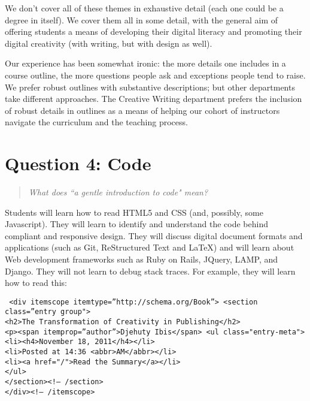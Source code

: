 \documentclass[letterpaper,10pt,headsepline]{scrreprt}
\begin{document}
We don't cover all of these themes in exhaustive detail (each one could be a degree in itself). We cover them all in some detail, with the general aim of offering students a means of developing their digital literacy and promoting their digital creativity (with writing, but with design as well).

Our experience has been somewhat ironic: the more details one includes in a course outline, the more questions people ask and exceptions people tend to raise. We prefer robust outlines with substantive descriptions; but other departments take different approaches. The Creative Writing department prefers the inclusion of robust details in outlines as a means of helping our cohort of instructors navigate the curriculum and the teaching process.

\section{Question 4: Code}

\begin{quote}
\textit{What does ``a gentle introduction to code" mean?}
\end{quote}

Students will learn how to read HTML5 and CSS (and, possibly, some Javascript). They will learn to identify and understand the code behind compliant and responsive design. They will discuss digital document formats and applications (such as Git, ReStructured Text and \LaTeX) and will learn about Web development frameworks such as Ruby on Rails, JQuery, LAMP, and Django. They will not learn to debug stack traces. For example, they will learn how to read this:

\vspace{10 pt}
\texttt{
\noindent 
<div itemscope itemtype=''http://schema.org/Book''>
<section class=''entry group">\\
<h2>The Transformation of Creativity in Publishing</h2>\\
<p><span itemprop=''author''>Djehuty Ibis</span>
<ul class="entry-meta">\\
<li><h4>November 18, 2011</h4></li>\\
<li>Posted at 14:36 <abbr>AM</abbr></li>\\
<li><a href="/">Read the Summary</a></li>\\
</ul>\\
</section><!-- /section>\\
</div><!-- /itemscope>
}
\end{document}
